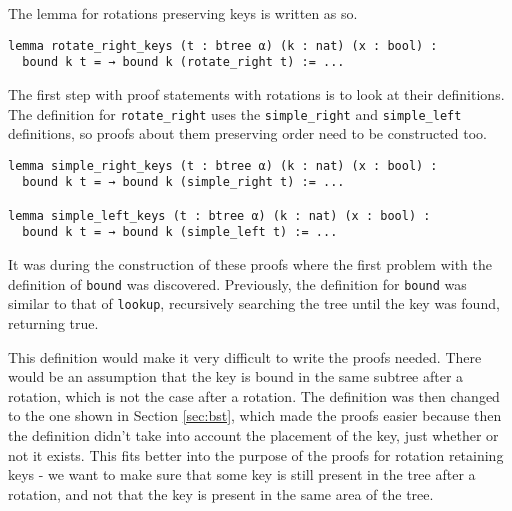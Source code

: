 The lemma for rotations preserving keys is written as so.

\begin{lstlisting}
lemma rotate_right_keys (t : btree α) (k : nat) (x : bool) :
  bound k t = → bound k (rotate_right t) := ...
\end{lstlisting}

The first step with proof statements with rotations is to look at their definitions. The definition for \lstinline{rotate_right} uses the \lstinline{simple_right} and \lstinline{simple_left} definitions, so proofs about them preserving order need to be constructed too.

\begin{lstlisting}
lemma simple_right_keys (t : btree α) (k : nat) (x : bool) :
  bound k t = → bound k (simple_right t) := ...
  
lemma simple_left_keys (t : btree α) (k : nat) (x : bool) :
  bound k t = → bound k (simple_left t) := ...
\end{lstlisting}

It was during the construction of these proofs where the first problem with the definition of \lstinline{bound} was discovered. Previously, the definition for \lstinline{bound} was similar to that of \lstinline{lookup}, recursively searching the tree until the key was found, returning true.

This definition would make it very difficult to write the proofs needed. There would be an assumption that the key is bound in the same subtree after a rotation, which is not the case after a rotation. The definition was then changed to the one shown in Section \ref{sec:bst}, which made the proofs easier because then the definition didn't take into account the placement of the key, just whether or not it exists. This fits better into the purpose of the proofs for rotation retaining keys - we want to make sure that some key is still present in the tree after a rotation, and not that the key is present in the same area of the tree.